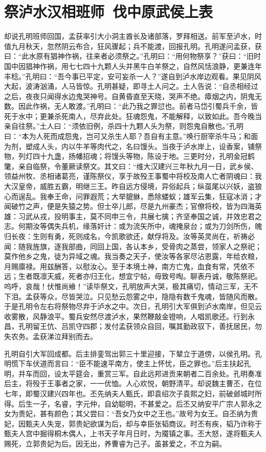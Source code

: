 \chapter{祭泸水汉相班师~伐中原武侯上表}

却说孔明班师回国，孟获率引大小洞主酋长及诸部落，罗拜相送。前军至泸水，时值九月秋天，忽然阴云布合，狂风骤起；兵不能渡，回报孔明。孔明遂问孟获，获曰：“此水原有猖神作祸，往来者必须祭之。”孔明曰：“用何物祭享？”获曰：“旧时国中因猖神作祸，用七七四十九颗人头并黑牛白羊祭之，自然风恬浪静，更兼连年丰稔。”孔明曰：“吾今事已平定，安可妄杀一人？”遂自到泸水岸边观看。果见阴风大起，波涛汹涌，人马皆惊。孔明甚疑，即寻土人问之。土人告说：“自丞相经过之后，夜夜只闻得水边鬼哭神号。自黄昏直至天晓，哭声不绝。瘴烟之内，阴鬼无数。因此作祸，无人敢渡。”孔明曰：“此乃我之罪愆也。前者马岱引蜀兵千余，皆死于水中；更兼杀死南人，尽弃此处。狂魂怨鬼，不能解释，以致如此。吾今晚当亲自往祭。”土人曰：“须依旧例，杀四十九颗人头为祭，则怨鬼自散也。”孔明曰：“本为人死而成怨鬼，岂可又杀生人耶？吾自有主意。”唤行厨宰杀牛马；和面为剂，塑成人头，内以牛羊等肉代之，名曰馒头。当夜于泸水岸上，设香案，铺祭物，列灯四十九盏，扬幡招魂；将馒头等物，陈设于地。三更时分，孔明金冠鹤氅，亲自临祭，令董厥读祭文。其文曰：“维大汉建兴三年秋九月一日，武乡侯、领益州牧、丞相诸葛亮，谨陈祭仪，享于故殁王事蜀中将校及南人亡者阴魂曰：我大汉皇帝，威胜五霸，明继三王。昨自远方侵境，异俗起兵；纵虿尾以兴妖，盗狼心而逞乱。我奉王命，问罪遐荒；大举貔貅，悉除蝼蚁；雄军云集，狂寇冰消；才闻破竹之声，便是失猿之势。但士卒儿郎，尽是九州豪杰；官僚将校，皆为四海英雄：习武从戎，投明事主，莫不同申三令，共展七擒；齐坚奉国之诚，并效忠君之志。何期汝等偶失兵机，缘落奸计：或为流矢所中，魂掩泉台；或为刀剑所伤，魄归长夜：生则有勇，死则成名，今凯歌欲还，献俘将及。汝等英灵尚在，祈祷必闻：随我旌旗，逐我部曲，同回上国，各认本乡，受骨肉之蒸尝，领家人之祭祀；莫作他乡之鬼，徒为异域之魂。我当奏之天子，使汝等各家尽沾恩露，年给衣粮，月赐廪禄。用兹酬答，以慰汝心。至于本境土神，南方亡鬼，血食有常，凭依不远；生者既凛天威，死者亦归王化，想宜宁帖，毋致号啕。聊表丹诚，敬陈祭祀。呜呼，哀哉！伏惟尚飨！”读毕祭文，孔明放声大哭，极其痛切，情动三军，无不下泪。孟获等众，尽皆哭泣。只见愁云怨雾之中，隐隐有数千鬼魂，皆随风而散。于是孔明令左右将祭物尽弃于泸水之中。次日，孔明引大军俱到泸水南岸，但见云收雾散，风静浪平。蜀兵安然尽渡泸水，果然鞭敲金镫响，人唱凯歌还。行到永昌，孔明留王伉、吕凯守四郡；发付孟获领众自回，嘱其勤政驭下，善抚居民，勿失农务。孟获涕泣拜别而去。

孔明自引大军回成都。后主排銮驾出郭三十里迎接，下辇立于道傍，以侯孔明。孔明慌下车伏道而言曰：“臣不能速平南方，使主上怀忧，臣之罪也。”后主扶起孔明，并车而回，设太平筵会，重赏三军。自此远邦进贡来朝者二百余处。孔明奏准后主，将殁于王事者之家，一一优恤。人心欢悦，朝野清平。却说魏主曹丕，在位七年，即蜀汉建兴四年也。丕先纳夫人甄氏，即袁绍次子袁熙之妇，前破邺城时所得。后生一子，名睿，字元仲，自幼聪明，不甚爱之。后丕又纳安平广宗人郭永之女为贵妃，甚有颜色；其父尝曰：“吾女乃女中之王也。”故号为女王。自丕纳为贵妃，因甄夫人失宠，郭贵妃欲谋为后，却与幸臣张韬商议。时丕有疾，韬乃诈称于甄夫人宫中掘得桐木偶人，上书天子年月日时，为魇镇之事。丕大怒，遂将甄夫人赐死，立郭贵妃为后。因无出，养曹睿为己子。虽甚爱之，不立为嗣。

